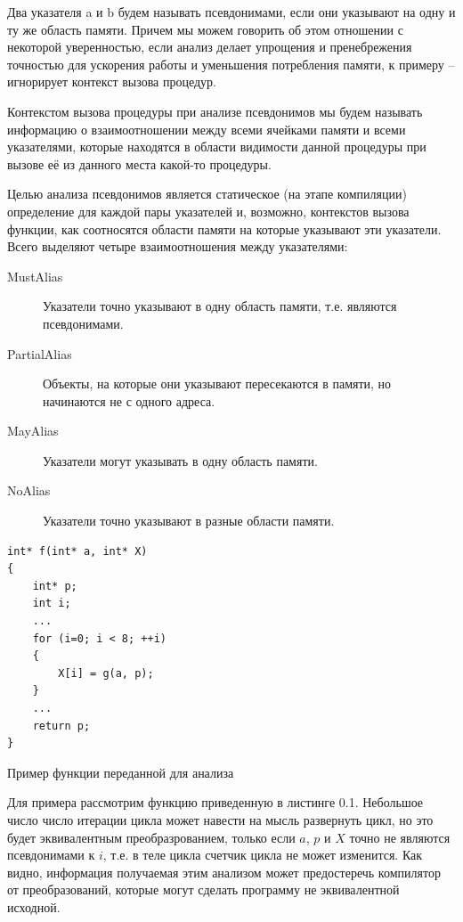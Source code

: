 \begin{mydefinition}
Два указателя a и b будем называть псевдонимами, если они указывают на одну и ту же область памяти. Причем мы можем говорить об этом отношении с некоторой уверенностью, если анализ делает упрощения и пренебрежения точностью для ускорения работы и уменьшения потребления памяти, к примеру -- игнорирует контекст вызова процедур.
\end{mydefinition}

\begin{mydefinition}
Контекстом вызова процедуры при анализе псевдонимов мы будем называть информацию о взаимоотношении между всеми ячейками памяти и всеми указателями, которые находятся в области видимости данной процедуры при вызове её из данного места какой-то процедуры. 
\end{mydefinition}

Целью анализа псевдонимов является статическое (на этапе компиляции) определение для каждой пары указателей и, возможно, контекстов вызова функции, как соотносятся области памяти на которые указывают эти указатели. Всего выделяют четыре взаимоотношения между указателями:
\begin{description}
  \item[MustAlias] Указатели точно указывают в одну область памяти, т.е. являются псевдонимами.
  \item[PartialAlias] Объекты, на которые они указывают пересекаются в памяти, но начинаются не с одного адреса.
  \item[MayAlias] Указатели могут указывать в одну область памяти.
  \item[NoAlias] Указатели точно указывают в разные области памяти.
\end{description}

\begin{ListingEnv}[H]
\begin{lstlisting}
int* f(int* a, int* X)
{
    int* p;
    int i;
    ...
    for (i=0; i < 8; ++i)
    {
        X[i] = g(a, p);
    }
    ...
    return p;
}
\end{lstlisting}
\caption{Пример функции переданной для анализа}
\end{ListingEnv}

Для примера рассмотрим функцию приведенную в листинге 0.1. Небольшое число число итерации цикла может навести на мысль развернуть цикл, но это будет эквивалентным преобразрованием, только если $a$, $p$ и $X$ точно не являются псевдонимами к $i$, т.е. в теле цикла счетчик цикла не может изменится. Как видно, информация получаемая этим анализом может предостеречь компилятор от преобразований, которые могут сделать программу не эквивалентной исходной.

